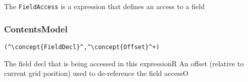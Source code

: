 The {\tt FieldAccess} is a expression that defines an access to a field

\subsubsection*{ContentsModel}{}

\begin{lstlisting}[style=default,frame=none]
(^\concept{FieldDecl}^,^\concept{Offset}^+)
\end{lstlisting}

\begin{HIRChildElements}
	{The field decl that is being accessed in this expression}{R}
	{An offset (relative to current grid position) used to de-reference the field access}{O}
\end{HIRChildElements}
